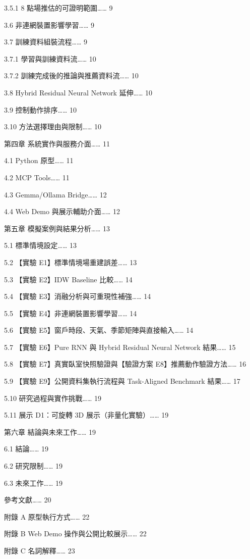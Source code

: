 \documentclass[12pt,a4paper]{article}
\begin{document}
    3.5.1 8 點場推估的可證明範圍…… 9


  3.6 非連網裝置影響學習…… 9


  3.7 訓練資料組裝流程…… 9


    3.7.1 學習與訓練資料流…… 10


    3.7.2 訓練完成後的推論與推薦資料流…… 10


  3.8 Hybrid Residual Neural Network 延伸…… 10


  3.9 控制動作排序…… 10


  3.10 方法選擇理由與限制…… 10


第四章 系統實作與服務介面…… 11


  4.1 Python 原型…… 11


  4.2 MCP Tools…… 11


  4.3 Gemma/Ollama Bridge…… 12


  4.4 Web Demo 與展示輔助介面…… 12


第五章 模擬案例與結果分析…… 13


  5.1 標準情境設定…… 13


  5.2 【實驗 E1】標準情境場重建誤差…… 13


  5.3 【實驗 E2】IDW Baseline 比較…… 14


  5.4 【實驗 E3】消融分析與可重現性補強…… 14


  5.5 【實驗 E4】非連網裝置影響學習…… 14


  5.6 【實驗 E5】窗戶時段、天氣、季節矩陣與直接輸入…… 14


  5.7 【實驗 E6】Pure RNN 與 Hybrid Residual Neural Network 結果…… 15


  5.8 【實驗 E7】真實臥室快照驗證與【驗證方案 E8】推薦動作驗證方法…… 16


  5.9 【實驗 E9】公開資料集執行流程與 Task-Aligned Benchmark 結果…… 17


  5.10 研究過程與實作挑戰…… 19


  5.11 展示 D1：可旋轉 3D 展示（非量化實驗）…… 19


第六章 結論與未來工作…… 19


  6.1 結論…… 19


  6.2 研究限制…… 19


  6.3 未來工作…… 19


參考文獻…… 20


附錄 A 原型執行方式…… 22


附錄 B Web Demo 操作與公開比較展示…… 22


附錄 C 名詞解釋…… 23


\clearpage
\end{document}
